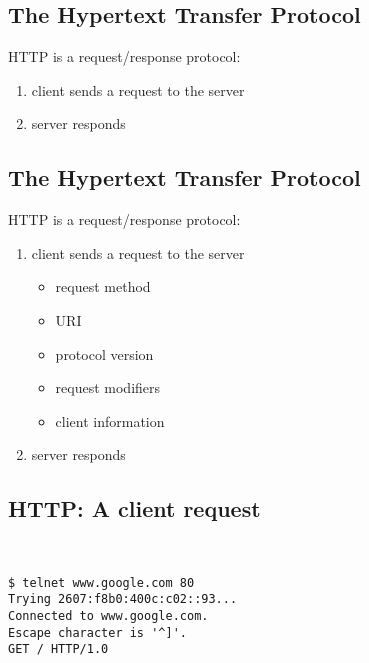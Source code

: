 \documentclass[xga]{xdvislides}
\begin{document}
\subsection{The Hypertext Transfer Protocol}
HTTP is a request/response protocol:
\begin{enumerate}
	\item client sends a request to the server
	\item server responds
\end{enumerate}

\subsection{The Hypertext Transfer Protocol}
HTTP is a request/response protocol:
\begin{enumerate}
	\item client sends a request to the server
		\begin{itemize}
			\item request method
			\item URI
			\item protocol version
			\item request modifiers
			\item client information
		\end{itemize}
	\item server responds
\end{enumerate}

\subsection{HTTP: A client request}
\vspace*{.5in}
\\
\Hugesize
\begin{center}
\begin{verbatim}
$ telnet www.google.com 80
Trying 2607:f8b0:400c:c02::93...
Connected to www.google.com.
Escape character is '^]'.
GET / HTTP/1.0

\end{verbatim}
\end{center}
\Normalsize
\vspace*{\fill}
\end{document}
